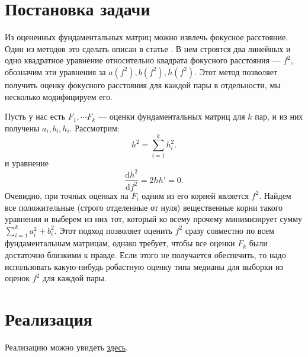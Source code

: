 \section{Постановка задачи}
Из оцененных фундаментальных матриц можно извлечь фокусное расстояние. Один из методов это сделать описан в статье \cite{Sturm:2005:FLC:1090456.1649082}. В нем строятся два линейных и одно квадратное уравнение относительно квадрата фокусного расстояния --- $f^2$, обозначим эти уравнения за $a\left(f^2\right), b\left(f^2\right), h\left(f^2\right)$. Этот метод позволяет получить  оценку фокусного расстояния для каждой пары в отдельности, мы несколько модифицируем его. 

Пусть у нас есть $F_1, \cdots F_k$ --- оценки фундаментальных матриц для $k$ пар, и из них получены $a_i, b_i, h_i$. 
Рассмотрим:
\begin{equation}
	h^2 = \sum\limits_{i=1}^{k} h^2_i.
\end{equation} 
и уравнение 
\begin{equation}
	\frac{\mathrm{d} h^2}{\mathrm{d}f^2} = 2hh' = 0.
\end{equation} 
Очевидно, при точных оценках на $F_i$  одним из его корней является $f^2$. Найдем все положительные (строго отделенные от нуля) вещественные корни такого уравнения и выберем из них тот, который ко всему прочему минимизирует сумму $\sum\limits_{i=1}^{k} a_i^2 + b_i^2$. Этот подход позволяет оценить $f^2$ сразу совместно по всем фундаментальным матрицам, однако требует, чтобы все оценки $F_k$ были достаточно близкими к правде. Если этого не получается обеспечить, то надо использовать какую-нибудь робастную оценку типа медианы для выборки из оценок $f^2$ для каждой пары.
\section{Реализация}
Реализацию можно увидеть \href{https://github.com/QuantumMechanicus/camera_calibration_test/blob/dev/subroutines/focal_length_estimator/Focal_Estimator.cpp}{здесь}.
